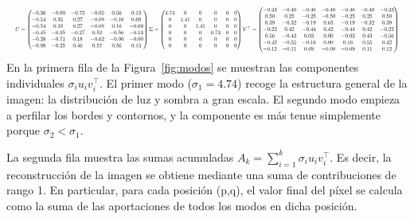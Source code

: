 \[
	\resizebox{\textwidth}{!}{$
			U=
			\begin{pmatrix}
				-0.36 & -0.00 & -0.73 & -0.05 & 0.56  & 0.13  \\
				-0.54 & 0.35  & 0.27  & -0.08 & -0.16 & 0.69  \\
				-0.54 & 0.35  & 0.27  & -0.08 & 0.16  & -0.69 \\
				-0.45 & -0.35 & -0.27 & 0.52  & -0.56 & -0.13 \\
				-0.28 & -0.71 & 0.18  & -0.62 & -0.00 & -0.00 \\
				-0.08 & -0.35 & 0.46  & 0.57  & 0.56  & 0.13
			\end{pmatrix}
			\Sigma=
			\begin{pmatrix}
				4.74 & 0    & 0    & 0    & 0 & 0 \\
				0    & 1.41 & 0    & 0    & 0 & 0 \\
				0    & 0    & 1.41 & 0    & 0 & 0 \\
				0    & 0    & 0    & 0.73 & 0 & 0 \\
				0    & 0    & 0    & 0    & 0 & 0 \\
				0    & 0    & 0    & 0    & 0 & 0
			\end{pmatrix}
			V^{\top}=
			\begin{pmatrix}
				-0.23 & -0.40 & -0.46 & -0.40 & -0.46 & -0.40 & -0.23 \\
				0.50  & 0.25  & -0.25 & -0.50 & -0.25 & 0.25  & 0.50  \\
				0.39  & -0.32 & -0.19 & 0.65  & -0.19 & -0.32 & 0.39  \\
				-0.22 & 0.42  & -0.44 & 0.42  & -0.44 & 0.42  & -0.22 \\
				0.56  & -0.43 & 0.03  & 0.00  & -0.03 & 0.43  & -0.56 \\
				-0.42 & -0.55 & -0.16 & 0.00  & 0.16  & 0.55  & 0.42  \\
				-0.12 & -0.11 & 0.69  & -0.00 & -0.69 & 0.11  & 0.12
			\end{pmatrix}
		$}
\]
En la primera fila de la Figura~\ref{fig:modos} se muestran las componentes
individuales $\sigma_i u_i v_i^{\top}$. El primer modo ($\sigma_1 = 4.74$) recoge
la estructura general de la imagen: la distribución de luz y sombra a gran
escala. El segundo modo empieza a perfilar los bordes y contornos, y la componente es
más tenue simplemente porque $\sigma_2 < \sigma_1$.

La segunda fila muestra las sumas acumuladas $A_k = \sum_{i=1}^{k} \sigma_i
	u_i v_i^{\top}$.
Es decir, la reconstrucción de la imagen se obtiene mediante una suma de contribuciones de rango 1.
En particular, para cada posición (p,q), el valor final del píxel se calcula como la suma de las aportaciones de todos los modos en dicha posición.
